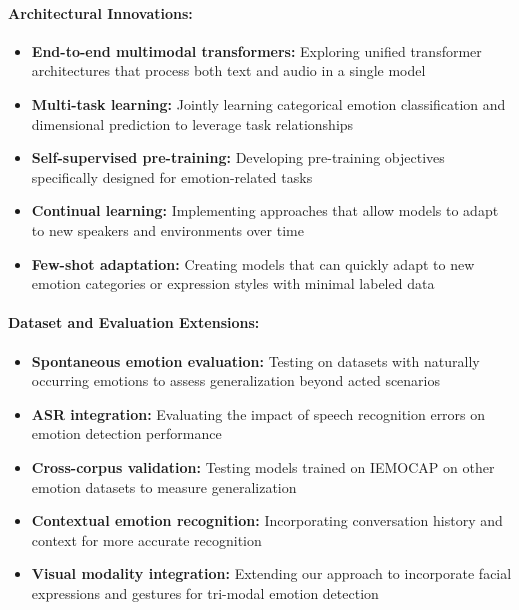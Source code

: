 \documentclass[12pt]{article}
\begin{document}
\paragraph{Architectural Innovations:}
\begin{itemize}
    \item \textbf{End-to-end multimodal transformers:} Exploring unified transformer architectures that process both text and audio in a single model
    
    \item \textbf{Multi-task learning:} Jointly learning categorical emotion classification and dimensional prediction to leverage task relationships
    
    \item \textbf{Self-supervised pre-training:} Developing pre-training objectives specifically designed for emotion-related tasks
    
    \item \textbf{Continual learning:} Implementing approaches that allow models to adapt to new speakers and environments over time
    
    \item \textbf{Few-shot adaptation:} Creating models that can quickly adapt to new emotion categories or expression styles with minimal labeled data
\end{itemize}

\paragraph{Dataset and Evaluation Extensions:}
\begin{itemize}
    \item \textbf{Spontaneous emotion evaluation:} Testing on datasets with naturally occurring emotions to assess generalization beyond acted scenarios
    
    \item \textbf{ASR integration:} Evaluating the impact of speech recognition errors on emotion detection performance
    
    \item \textbf{Cross-corpus validation:} Testing models trained on IEMOCAP on other emotion datasets to measure generalization
    
    \item \textbf{Contextual emotion recognition:} Incorporating conversation history and context for more accurate recognition
    
    \item \textbf{Visual modality integration:} Extending our approach to incorporate facial expressions and gestures for tri-modal emotion detection
\end{itemize}
\end{document}
